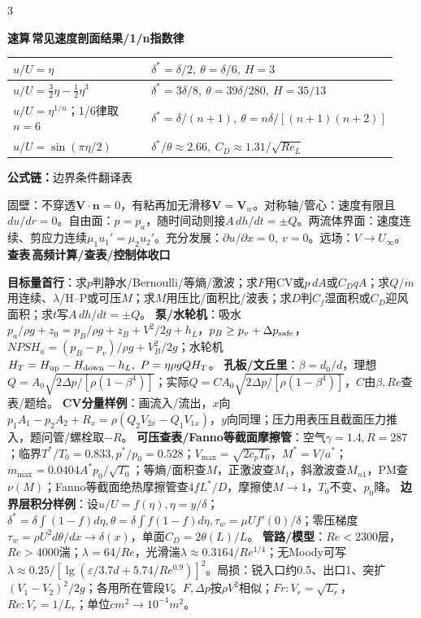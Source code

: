 \documentclass[a4paper]{article}
\newcommand{\form}[1]{{\color{M}\bfseries 公式链：}#1\par}
\newcommand{\labtag}[3]{{\bfseries\color{#1}\colorbox{#1}{\color{white}\fontsize{2.18}{2.28}\selectfont #2}\,#3}\par}
\newcommand{\lookup}[1]{\labtag{C}{查表}{#1}}
\newcommand{\formq}[1]{\form{#1}}
\newcommand{\lookq}[1]{\lookup{#1}}
\newcommand{\quickq}[1]{\labtag{F}{速算}{#1}}
\newenvironment{vfourWrap}{\par\begingroup\fontsize{2.56}{2.70}\selectfont\setlength{\fboxsep}{0.38pt}}{\par\endgroup}
\begin{document}
\begin{multicols}{3}
\begin{vfourWrap}
\quickq{常见速度剖面结果/1/n指数律}
\begin{tabular}{|p{0.42\linewidth}|p{0.52\linewidth}|}\hline
$u/U=\eta$ & $\delta^*=\delta/2,\ \theta=\delta/6,\ H=3$\\\hline
$u/U=\frac32\eta-\frac12\eta^3$ & $\delta^*=3\delta/8,\ \theta=39\delta/280,\ H=35/13$\\\hline
$u/U=\eta^{1/n}$；1/6律取$n=6$ & $\delta^*=\delta/(n+1),\ \theta=n\delta/[(n+1)(n+2)]$\\\hline
$u/U=\sin(\pi\eta/2)$ & $\delta^*/\theta\approx2.66,\ C_D\approx1.31/\sqrt{Re_L}$\\\hline
\end{tabular}
\formq{边界条件翻译表}
固壁：不穿透$\bm V\cdot\bm n=0$，有粘再加无滑移$\bm V=\bm V_w$。对称轴/管心：速度有限且$du/dr=0$。自由面：$p=p_a$，随时间动则接$A\,dh/dt=\pm Q$。两流体界面：速度连续、剪应力连续$\mu_1u_1'=\mu_2u_2'$。充分发展：$\partial u/\partial x=0,\ v=0$。远场：$V\to U_\infty$。
\lookq{高频计算/查表/控制体收口}
{\fontsize{4.35}{4.45}\selectfont
\textbf{目标量首行}：求$p$判静水/Bernoulli/等熵/激波；求$F$用CV或$p\,dA$或$C_DqA$；求$Q/\dot m$用连续、$\lambda$/H--P或可压$M$；求$M$用压比/面积比/波表；求$D$判$C_f$湿面积或$C_D$迎风面积；求$t$写$A\,dh/dt=\pm Q$。 
\textbf{泵/水轮机}：吸水$p_a/\rho g+z_0=p_B/\rho g+z_B+V^2/2g+h_L$，$p_B\ge p_v+\Delta p_{\rm safe}$，$NPSH_a=(p_B-p_v)/\rho g+V_B^2/2g$；水轮机$H_T=H_{\rm up}-H_{\rm down}-h_L,\ P=\eta\rho gQH_T$。 
\textbf{孔板/文丘里}：$\beta=d_0/d$，理想$Q=A_0\sqrt{2\Delta p/[\rho(1-\beta^4)]}$；实际$Q=C A_0\sqrt{2\Delta p/[\rho(1-\beta^4)]}$，$C$由$\beta,Re$查表/题给。 
\textbf{CV分量样例}：画流入/流出，$x$向$p_1A_1-p_2A_2+R_x=\rho(Q_2V_{2x}-Q_1V_{1x})$，$y$向同理；压力用表压且截面压力推入，题问管/螺栓取$-R$。 
\textbf{可压查表/Fanno等截面摩擦管}：空气$\gamma=1.4,R=287$；临界$T^*/T_0=0.833,p^*/p_0=0.528$；$V_{\max}=\sqrt{2c_pT_0}$，$M^*=V/a^*$；$\dot m_{\max}=0.0404A^*p_0/\sqrt{T_0}$；等熵/面积查$M$，正激波查$M_1$，斜激波查$M_{n1}$，PM查$\nu(M)$；Fanno等截面绝热摩擦管查$4fL^*/D$，摩擦使$M\to1$，$T_0$不变、$p_0$降。 
\textbf{边界层积分样例}：设$u/U=f(\eta),\eta=y/\delta$；$\delta^*=\delta\int(1-f)d\eta,\theta=\delta\int f(1-f)d\eta,\tau_w=\mu Uf'(0)/\delta$；零压梯度$\tau_w=\rho U^2d\theta/dx\to\delta(x)$，单面$C_D=2\theta(L)/L$。 
\textbf{管路/模型}：$Re<2300$层，$Re>4000$湍；$\lambda=64/Re$，光滑湍$\lambda\approx0.3164/Re^{1/4}$；无Moody可写$\lambda\approx0.25/[\lg(\varepsilon/3.7d+5.74/Re^{0.9})]^2$。局损：锐入口约0.5、出口1、突扩$(V_1-V_2)^2/2g$；各用所在管段$V$。$F,\Delta p$按$\rho V^2$相似；$Fr:V_r=\sqrt{L_r}$，$Re:V_r=1/L_r$；单位$cm^2\to10^{-4}m^2$。}

\end{vfourWrap}
\end{multicols}
\end{document}
